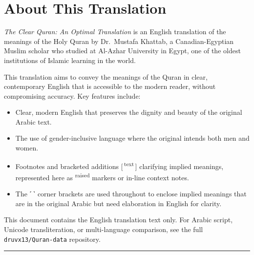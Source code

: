 \documentclass[11pt, twoside, openright]{book}
\begin{document}
\chapter*{About This Translation}

\textit{The Clear Quran: An Optimal Translation} is an English translation of
the meanings of the Holy Quran by Dr.~Mustafa Khattab, a Canadian-Egyptian
Muslim scholar who studied at Al-Azhar University in Egypt, one of the oldest
institutions of Islamic learning in the world.

\medskip
This translation aims to convey the meanings of the Quran in clear, contemporary
English that is accessible to the modern reader, without compromising accuracy.
Key features include:

\medskip
\begin{itemize}
  \setlength\itemsep{2pt}
  \item Clear, modern English that preserves the dignity and beauty of the
        original Arabic text.
  \item The use of gender-inclusive language where the original intends both
        men and women.
  \item Footnotes and bracketed additions [\,\textsuperscript{text}\,] clarifying
        implied meanings, represented here as \textsuperscript{raised} markers
        or in-line context notes.
  \item The ˹\,˺ corner brackets are used throughout to enclose implied
        meanings that are in the original Arabic but need elaboration in
        English for clarity.
\end{itemize}

\medskip
This document contains the English translation text only. For Arabic script,
Unicode transliteration, or multi-language comparison, see the full
\texttt{druvx13/Quran-data} repository.

\bigskip
\noindent\textcolor{goldenbrown}{\rule{\linewidth}{0.3pt}}

\tableofcontents

\mainmatter


\end{document}
